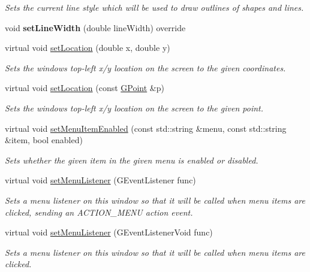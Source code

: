 \begin{DoxyCompactItemize}
\begin{DoxyCompactList}\small\item\em Sets the current line style which will be used to draw outlines of shapes and lines. \end{DoxyCompactList}\item 
void {\bfseries set\+Line\+Width} (double line\+Width) override
\item 
virtual void \mbox{\hyperlink{classGWindow_a04594e8ba9b98513a64f1da00dcae18c}{set\+Location}} (double x, double y)
\begin{DoxyCompactList}\small\item\em Sets the window\textquotesingle{}s top-\/left x/y location on the screen to the given coordinates. \end{DoxyCompactList}\item 
virtual void \mbox{\hyperlink{classGWindow_a6ef8e1a904fffe55052f7a22f8552e4b}{set\+Location}} (const \mbox{\hyperlink{structGPoint}{G\+Point}} \&p)
\begin{DoxyCompactList}\small\item\em Sets the window\textquotesingle{}s top-\/left x/y location on the screen to the given point. \end{DoxyCompactList}\item 
virtual void \mbox{\hyperlink{classGWindow_a875124740630bebec069479fd3958efc}{set\+Menu\+Item\+Enabled}} (const std\+::string \&menu, const std\+::string \&item, bool enabled)
\begin{DoxyCompactList}\small\item\em Sets whether the given item in the given menu is enabled or disabled. \end{DoxyCompactList}\item 
virtual void \mbox{\hyperlink{classGWindow_ab0002e0bf6566a5b98cc9128cb859b0e}{set\+Menu\+Listener}} (G\+Event\+Listener func)
\begin{DoxyCompactList}\small\item\em Sets a menu listener on this window so that it will be called when menu items are clicked, sending an A\+C\+T\+I\+O\+N\+\_\+\+M\+E\+NU action event. \end{DoxyCompactList}\item 
virtual void \mbox{\hyperlink{classGWindow_a1294d48e67c30207da71c3e3ab56abde}{set\+Menu\+Listener}} (G\+Event\+Listener\+Void func)
\begin{DoxyCompactList}\small\item\em Sets a menu listener on this window so that it will be called when menu items are clicked. \end{DoxyCompactList}\item 

\end{DoxyCompactItemize}
